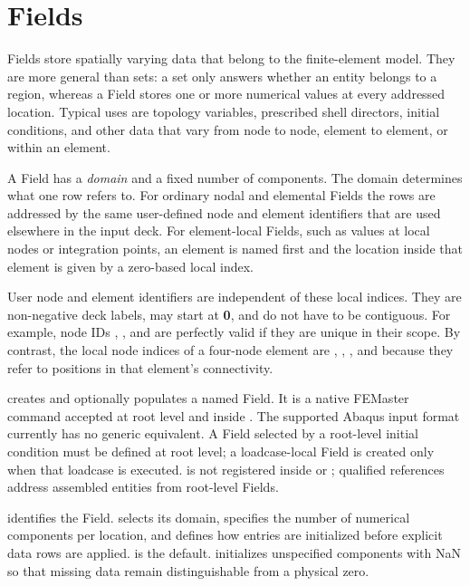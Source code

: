 \chapter{Fields}
\label{chap:fields}

Fields store spatially varying data that belong to the finite-element model. They are more general than sets: a set only answers whether an entity belongs to a region, whereas a Field stores one or more numerical values at every addressed location. Typical uses are topology variables, prescribed shell directors, initial conditions, and other data that vary from node to node, element to element, or within an element.

A Field has a \emph{domain} and a fixed number of components. The domain determines what one row refers to. For ordinary nodal and elemental Fields the rows are addressed by the same user-defined node and element identifiers that are used elsewhere in the input deck. For element-local Fields, such as values at local nodes or integration points, an element is named first and the location inside that element is given by a zero-based local index.

User node and element identifiers are independent of these local indices. They are non-negative deck labels, may start at \textbf{0}, and do not have to be contiguous. For example, node IDs , , and  are perfectly valid if they are unique in their scope. By contrast, the local node indices of a four-node element are , , , and  because they refer to positions in that element's connectivity.


 creates and optionally populates a named Field. It is a native FEMaster command accepted at root level and inside . The supported Abaqus input format currently has no generic equivalent. A Field selected by a root-level initial condition must be defined at root level; a loadcase-local Field is created only when that loadcase is executed.  is not registered inside  or ; qualified references address assembled entities from root-level Fields.

 identifies the Field.  selects its domain,  specifies the number of numerical components per location, and  defines how entries are initialized before explicit data rows are applied.  is the default.  initializes unspecified components with NaN so that missing data remain distinguishable from a physical zero.

